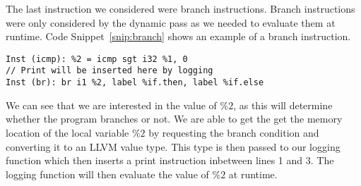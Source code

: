 The last instruction we considered were branch instructions\cite{branchinstruction}. Branch instructions were only considered by the dynamic pass as we needed to evaluate them at runtime. Code Snippet~\ref{snip:branch} shows an example of a branch instruction. 

\begin{lstlisting}[escapechar=@, caption={Branch Instruction}, label=snip:branch]
Inst (icmp): %2 = icmp sgt i32 %1, 0
// Print will be inserted here by logging
Inst (br): br i1 %2, label %if.then, label %if.else
\end{lstlisting}

 We can see that we are interested in the value of $\%2$, as this will determine whether the program branches or not. We are able to get the get the memory location of the local variable $\%2$ by requesting the branch condition and converting it to an LLVM value type. This type is then passed to our logging function which then inserts a print instruction inbetween lines 1 and 3. The logging function will then evaluate the value of $\%2$ at runtime.




